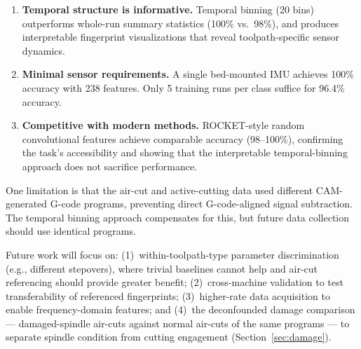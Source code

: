 \begin{enumerate}
    \item \textbf{Temporal structure is informative.} Temporal binning (20 bins) outperforms whole-run summary statistics (100\% vs.\ 98\%), and produces interpretable fingerprint visualizations that reveal toolpath-specific sensor dynamics.

    \item \textbf{Minimal sensor requirements.} A single bed-mounted IMU achieves 100\% accuracy with 238 features. Only 5 training runs per class suffice for 96.4\% accuracy.

    \item \textbf{Competitive with modern methods.} ROCKET-style random convolutional features achieve comparable accuracy (98--100\%), confirming the task's accessibility and showing that the interpretable temporal-binning approach does not sacrifice performance.
\end{enumerate}

One limitation is that the air-cut and active-cutting data used different CAM-generated G-code programs, preventing direct G-code-aligned signal subtraction. The temporal binning approach compensates for this, but future data collection should use identical programs.

Future work will focus on: (1)~within-toolpath-type parameter discrimination (e.g., different stepovers), where trivial baselines cannot help and air-cut referencing should provide greater benefit; (2)~cross-machine validation to test transferability of referenced fingerprints; (3)~higher-rate data acquisition to enable frequency-domain features; and (4)~the deconfounded damage comparison --- damaged-spindle air-cuts against normal air-cuts of the same programs --- to separate spindle condition from cutting engagement (Section~\ref{sec:damage}).
